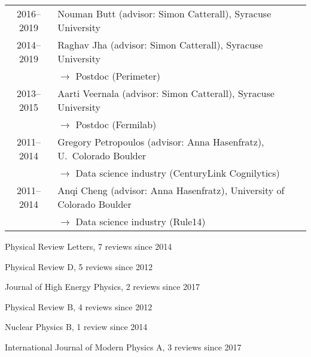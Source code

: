 \documentclass[10 pt]{article}
\renewcommand{\section}[2]%
    {\pagebreak[2]\vspace{1.3\baselineskip}%
     \hspace{0in}%
     \marginpar{
     \raggedright \scshape #1}#2}
\newenvironment{tightlist}
  {\begin{list} {} {\setlength{\topsep}{-8 pt} \setlength{\itemsep}{-3 pt} \setlength{\leftmargin}{0 mm}}}{\end{list}}
\newcommand{\blankline}{\quad\pagebreak[2]}
\newcommand{\spacer}{\blankline\vspace{12 pt}\blankline}
\newcommand{\lra}{\ensuremath{\longrightarrow} }
\begin{document}
\vspace{-12 pt} %
\begin{tabular}[t]{cl}
  2016--2019    & Nouman Butt (advisor: Simon Catterall), Syracuse University           \\[6 pt]
  2014--2019    & Raghav Jha (advisor: Simon Catterall), Syracuse University            \\
                & \qquad \lra Postdoc (Perimeter)                                       \\[6 pt]
  2013--2015    & Aarti Veernala (advisor: Simon Catterall), Syracuse University        \\
                & \qquad \lra Postdoc (Fermilab)                                        \\[6 pt]
  2011--2014    & Gregory Petropoulos (advisor: Anna Hasenfratz), U.~Colorado Boulder   \\
                & \qquad \lra Data science industry (CenturyLink Cognilytics)           \\[6 pt]
  2011--2014    & Anqi Cheng (advisor: Anna Hasenfratz), University of Colorado Boulder \\
                & \qquad \lra Data science industry (Rule14)                            \\
\end{tabular}

\spacer



\section{Journal referee} %

\vspace{-12 pt} %
\begin{tightlist} %
  \item Physical Review Letters, 7 reviews since 2014
  \item Physical Review D, 5 reviews since 2012
  \item Journal of High Energy Physics, 2 reviews since 2017
  \item Physical Review B, 4 reviews since 2012
  \item Nuclear Physics B, 1 review since 2014
  \item International Journal of Modern Physics A, 3 reviews since 2017
\end{tightlist}
\end{document}
